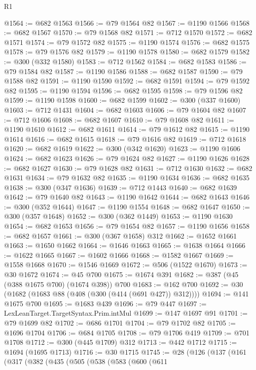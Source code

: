 \begin{lexlean}{R1}
\begin{coremodule}
@1564 := @682 @1563
@1566 := @79 @1564 @82
@1567 := @1190 @1566
@1568 := @682 @1567
@1570 := @79 @1568 @82
@1571 := @712 @1570
@1572 := @682 @1571
@1574 := @79 @1572 @82
@1575 := @1190 @1574
@1576 := @682 @1575
@1578 := @79 @1576 @82
@1579 := @1190 @1578
@1580 := @682 @1579
@1582 := @300 (@332 @1580)
@1583 := @712 @1562
@1584 := @682 @1583
@1586 := @79 @1584 @82
@1587 := @1190 @1586
@1588 := @682 @1587
@1590 := @79 @1588 @82
@1591 := @1190 @1590
@1592 := @682 @1591
@1594 := @79 @1592 @82
@1595 := @1190 @1594
@1596 := @682 @1595
@1598 := @79 @1596 @82
@1599 := @1190 @1598
@1600 := @682 @1599
@1602 := @300 (@337 @1600)
@1603 := @712 @1431
@1604 := @682 @1603
@1606 := @79 @1604 @82
@1607 := @712 @1606
@1608 := @682 @1607
@1610 := @79 @1608 @82
@1611 := @1190 @1610
@1612 := @682 @1611
@1614 := @79 @1612 @82
@1615 := @1190 @1614
@1616 := @682 @1615
@1618 := @79 @1616 @82
@1619 := @712 @1618
@1620 := @682 @1619
@1622 := @300 (@342 @1620)
@1623 := @1190 @1606
@1624 := @682 @1623
@1626 := @79 @1624 @82
@1627 := @1190 @1626
@1628 := @682 @1627
@1630 := @79 @1628 @82
@1631 := @712 @1630
@1632 := @682 @1631
@1634 := @79 @1632 @82
@1635 := @1190 @1634
@1636 := @682 @1635
@1638 := @300 (@347 @1636)
@1639 := @712 @1443
@1640 := @682 @1639
@1642 := @79 @1640 @82
@1643 := @1190 @1642
@1644 := @682 @1643
@1646 := @300 (@352 @1644)
@1647 := @1190 @1554
@1648 := @682 @1647
@1650 := @300 (@357 @1648)
@1652 := @300 (@362 @1449)
@1653 := @1190 @1630
@1654 := @682 @1653
@1656 := @79 @1654 @82
@1657 := @1190 @1656
@1658 := @682 @1657
@1661 := @300 (@367 @1658) @312
@1662 := @1652 @1661
@1663 := @1650 @1662
@1664 := @1646 @1663
@1665 := @1638 @1664
@1666 := @1622 @1665
@1667 := @1602 @1666
@1668 := @1582 @1667
@1669 := @1558 @1668
@1670 := @1546 @1669
@1672 := @506 (@1522 @1670)
@1673 := @30 @1672
@1674 := @45 @700
@1675 := @1674 @391
@1682 := @387 (@45 (@388 @1675 @700) (@1674 @398)) @700
@1683 := @162 @700
@1692 := @30 (@1682 (@1683 @88 (@408 (@300 (@414 (@691 @427)) @312))))
@1694 := @141 @1675 @700
@1695 := @1683 @439
@1696 := @79 @447
@1697 := LexLeanTarget.TargetSyntax.Prim.intMul
@1699 := @147 @1697 @91
@1701 := @79 @1699 @82
@1702 := @686 @1701
@1704 := @79 @1702 @82
@1705 := @1696 @1704
@1706 := @684 @1705
@1708 := @79 @1706 @419
@1709 := @701 @1708
@1712 := @300 (@445 @1709) @312
@1713 := @442 @1712
@1715 := @1694 (@1695 @1713)
@1716 := @30 @1715
@1745 := @28
    (@126
      (@137
        (@161
          (@317
            (@382
              (@435
                (@505
                  (@538
                    (@583
                      (@600
                        (@611

\end{coremodule}
\end{lexlean}

